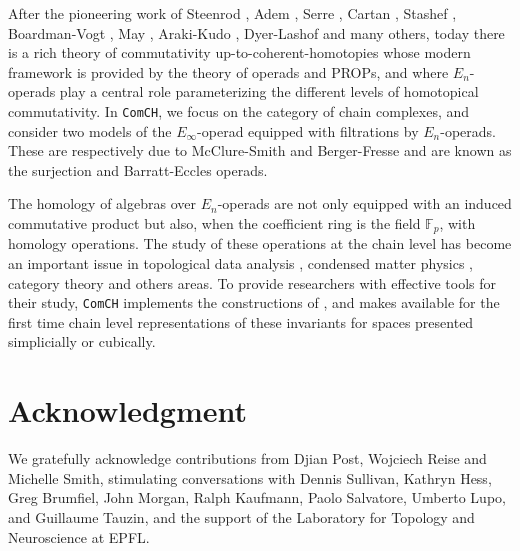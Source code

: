 \documentclass{amsart}
\begin{document}
After the pioneering work of Steenrod \cite{Steenrod47, Steenrod62}, Adem \cite{Adem52}, Serre \cite{Serre53}, Cartan \cite{Cartan55}, Stashef \cite{Stasheff63}, Boardman-Vogt \cite{BoardmanVogt73}, May \cite{May70algebraic, May72geometry}, Araki-Kudo \cite{ArakiKudo56}, Dyer-Lashof \cite{DyerLashof62} and many others, today there is a rich theory of commutativity up-to-coherent-homotopies whose modern framework is provided by the theory of operads and PROPs, and where $E_n$-operads play a central role parameterizing the different levels of homotopical commutativity. In \texttt{ComCH}, we focus on the category of chain complexes, and consider two models of the $E_\infty$-operad equipped with filtrations by $E_n$-operads. These are respectively due to McClure-Smith \cite{McClureSmith03} and Berger-Fresse \cite{BergerFresse04} and are known as the surjection and Barratt-Eccles operads.

The homology of algebras over $E_n$-operads are not only equipped with an induced commutative product but also, when the coefficient ring is the field $\mathbb F_p$, with homology operations. The study of these operations at the chain level has become an important issue in topological data analysis \cite{medina2018persistence}, condensed matter physics \cite{kapustin2017fermionic}, category theory \cite{medina2020globular} and others areas. To provide researchers with effective tools for their study, \texttt{ComCH} implements the constructions of \cite{medina2020chain}, and makes available for the first time chain level representations of these invariants for spaces presented simplicially or cubically.

\section*{Acknowledgment}
We gratefully acknowledge contributions from Djian Post, Wojciech Reise and Michelle Smith, stimulating conversations with Dennis Sullivan, Kathryn Hess, Greg Brumfiel, John Morgan, Ralph Kaufmann, Paolo Salvatore, Umberto Lupo, and Guillaume Tauzin, and the support of the Laboratory for Topology and Neuroscience at EPFL.



\end{document}
